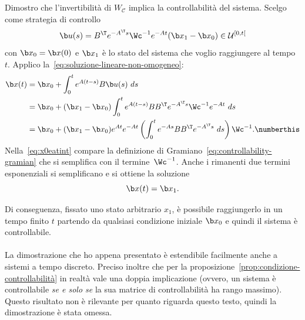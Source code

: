 \begin{steps}
    \item Dimostro che l'invertibilità di $W_{\mathcal C}$ implica la controllabilità del sistema.
    Scelgo come strategia di controllo
    \begin{equation*}
        \b u(s) = B^\T e^{-A^\T s} \Wc^{-1} e^{-At} (\b x_1 - \b x_0) \in \mathcal U^{[0, t[}
    \end{equation*}
    con $\b x_0 = \b x(0)$ e $\b x_1$ è lo stato del sistema che voglio raggiungere al tempo $t$.
    Applico la~\ref{eq:soluzione-lineare-non-omogeneo}:
    \begin{align*}
        \b x(t) &= \b x_0+ \int_0^t e^{A(t-s)} B \b u(s)\ ds \\
                &= \b x_0 + (\b x_1 - \b x_0) \int_0^t e^{A(t-s)} B B^\T e^{-A^\T s} \Wc^{-1} e^{-At}\ ds \\
                &= \b x_0 + (\b x_1 - \b x_0) e^{At} e^{-At} \left(\int_0^t e^{-As} B B^\T e^{-A^\T s}\ ds \right)\Wc^{-1}. \numberthis \label{eq:x0eatint}
    \end{align*}
    Nella~\eqref{eq:x0eatint} compare la definizione di Gramiano~\eqref{eq:controllability-gramian}
    che si semplifica con il termine~$\Wc^{-1}$.
    Anche i rimanenti due termini esponenziali si semplificano e si ottiene la soluzione
    \begin{equation*}
        \b x(t) = \b x_1.
    \end{equation*}
\end{steps}
Di conseguenza, fissato uno stato arbitrario $x_1$, è possibile raggiungerlo in un tempo finito $t$
partendo da qualsiasi condizione iniziale $\b x_0$ e quindi il sistema è controllabile.
\hfill\qedsymbol \paragraph{}

La dimostrazione che ho appena presentato è estendibile facilmente anche a
sistemi a tempo discreto.
Preciso inoltre che per la proposizione~\ref{prop:condizione-controllabilità} in realtà
vale una doppia implicazione (ovvero, un sistema è controllabile \emph{se e solo se}
la sua matrice di controllabilità ha rango massimo).
Questo risultato non è rilevante per quanto riguarda questo testo, quindi la dimostrazione
è stata omessa.


